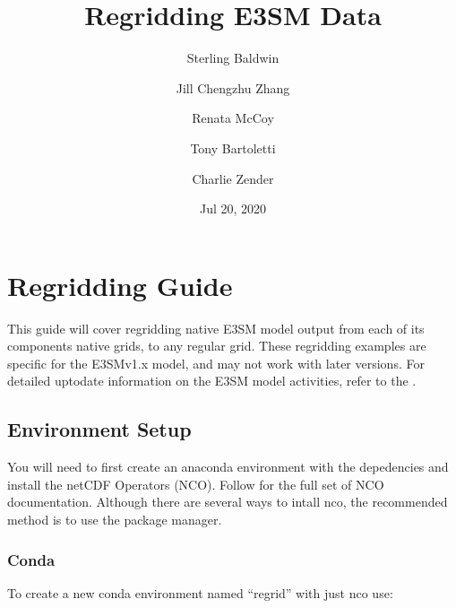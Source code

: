 \documentclass[letterpaper,10pt,english]{sphinxmanual}
\title{Regridding E3SM Data}
\date{Jul 20, 2020}
\author{Sterling Baldwin \and Jill Chengzhu Zhang \and Renata McCoy \and Tony Bartoletti \and Charlie Zender}
\begin{document}
\pagestyle{empty}
\sphinxmaketitle
\pagestyle{plain}
\sphinxtableofcontents
\pagestyle{normal}
\label{\detokenize{index::doc}}



\chapter{Regridding Guide}
\label{\detokenize{guide:regridding-guide}}\label{\detokenize{guide:guide}}\label{\detokenize{guide::doc}}
This guide will cover regridding native E3SM model output from each of its components native grids, to
any regular grid. These regridding examples are specific for the E3SMv1.x model, and may not work with later versions. For detailed up\sphinxhyphen{}to\sphinxhyphen{}date information on the
E3SM model activities, refer to the .


\section{Environment Setup}
\label{\detokenize{guide:environment-setup}}
You will need to first create an anaconda environment with the depedencies and install the netCDF Operators (NCO).
Follow  for the full set of NCO documentation.
Although there are several ways to intall nco, the recommended method is to use the  package manager.


\subsection{Conda}
\label{\detokenize{guide:id1}}
\begin{sphinxVerbatim}[commandchars=\\\{\}]
    
\end{sphinxVerbatim}

To create a new conda environment named “regrid” with just nco use:

\begin{sphinxVerbatim}[commandchars=\\\{\}]
      
\end{sphinxVerbatim}
\end{document}
